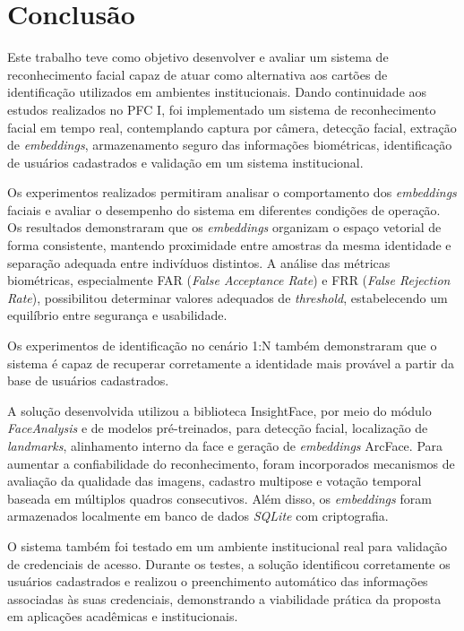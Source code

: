 \chapter{Conclusão}
\label{chap:conclusao}

Este trabalho teve como objetivo desenvolver e avaliar um sistema de reconhecimento facial capaz de atuar como alternativa aos cartões de identificação utilizados em ambientes institucionais. Dando continuidade aos estudos realizados no \acs{PFC} I, foi implementado um sistema de reconhecimento facial em tempo real, contemplando captura por câmera, detecção facial, extração de \textit{embeddings}, armazenamento seguro das informações biométricas, identificação de usuários cadastrados e validação em um sistema institucional.

Os experimentos realizados permitiram analisar o comportamento dos \textit{embeddings} faciais e avaliar o desempenho do sistema em diferentes condições de operação. Os resultados demonstraram que os \textit{embeddings} organizam o espaço vetorial de forma consistente, mantendo proximidade entre amostras da mesma identidade e separação adequada entre indivíduos distintos. A análise das métricas biométricas, especialmente \acs{FAR} (\textit{False Acceptance Rate}) e \acs{FRR} (\textit{False Rejection Rate}), possibilitou determinar valores adequados de \textit{threshold}, estabelecendo um equilíbrio entre segurança e usabilidade.

Os experimentos de identificação no cenário 1:N também demonstraram que o sistema é capaz de recuperar corretamente a identidade mais provável a partir da base de usuários cadastrados.

A solução desenvolvida utilizou a biblioteca InsightFace, por meio do módulo \textit{FaceAnalysis} e de modelos pré-treinados, para detecção facial, localização de \textit{landmarks}, alinhamento interno da face e geração de \textit{embeddings} ArcFace. Para aumentar a confiabilidade do reconhecimento, foram incorporados mecanismos de avaliação da qualidade das imagens, cadastro multipose e votação temporal baseada em múltiplos quadros consecutivos. Além disso, os \textit{embeddings} foram armazenados localmente em banco de dados \textit{SQLite} com criptografia.

O sistema também foi testado em um ambiente institucional real para validação de credenciais de acesso. Durante os testes, a solução identificou corretamente os usuários cadastrados e realizou o preenchimento automático das informações associadas às suas credenciais, demonstrando a viabilidade prática da proposta em aplicações acadêmicas e institucionais.

